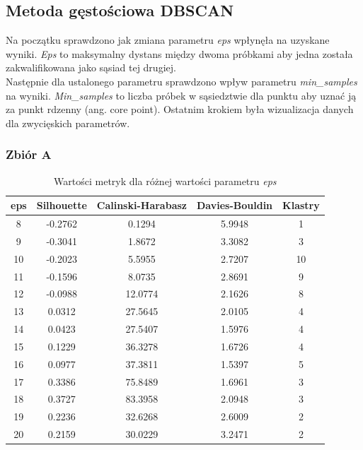 \documentclass[a4paper,11pt]{article}
\begin{document}
\subsection{Metoda gęstościowa DBSCAN}
Na początku sprawdzono jak zmiana parametru \textit{eps} wpłynęła na uzyskane wyniki. \textit{Eps} to maksymalny dystans między dwoma próbkami aby jedna została zakwalifikowana jako sąsiad tej drugiej. \\
Następnie dla ustalonego parametru sprawdzono wpływ parametru \textit{min\_samples} na wyniki. \textit{Min\_samples} to liczba próbek w sąsiedztwie dla punktu aby uznać ją za punkt rdzenny (ang. core point).
Ostatnim krokiem była wizualizacja danych dla zwycięskich parametrów. 
\subsubsection*{Zbiór A}

\begin{table}[H]
\centering
\begin{tabular}{|c|c|c|c|c|}
\hline
\textbf{eps} & \textbf{Silhouette} & \textbf{Calinski-Harabasz} & \textbf{Davies-Bouldin} & \textbf{Klastry} \\ \hline
8 & -0.2762 & 0.1294 & 5.9948 & 1 \\ \hline
9 & -0.3041 & 1.8672 & 3.3082 & 3 \\ \hline
10 & -0.2023 & 5.5955 & 2.7207 & 10 \\ \hline
11 & -0.1596 & 8.0735 & 2.8691 & 9 \\ \hline
12 & -0.0988 & 12.0774 & 2.1626 & 8 \\ \hline
13 & 0.0312 & 27.5645 & 2.0105 & 4 \\ \hline
14 & 0.0423 & 27.5407 & 1.5976 & 4 \\ \hline
15 & 0.1229 & 36.3278 & 1.6726 & 4 \\ \hline
16 & 0.0977 & 37.3811 & 1.5397 & 5 \\ \hline
17 & 0.3386 & 75.8489 & 1.6961 & 3 \\ \hline
18 & 0.3727 & 83.3958 & 2.0948 & 3 \\ \hline
19 & 0.2236 & 32.6268 & 2.6009 & 2 \\ \hline
20 & 0.2159 & 30.0229 & 3.2471 & 2 \\ \hline
\end{tabular}
\caption{Wartości metryk dla różnej wartości parametru \textit{eps}}
\label{tab:dbscan1}
\end{table}
\end{document}
